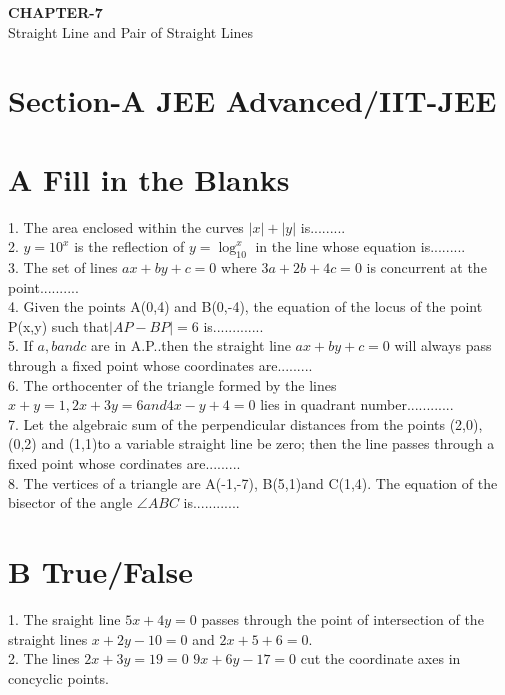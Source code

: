 \documentclass[12pt]{article}
\begin{document}
\begin{center}
\textbf{CHAPTER-7}\\
\vspace{2\bigskipamount}
\textbf\textbf\large{Straight Line and Pair of Straight Lines}


\end{center}
\section*{Section-A    JEE Advanced/IIT-JEE}
\section*{A      Fill in the Blanks}

1. The area enclosed within the curves $|x|+|y|$ is.........\\
2. $y=10^x$ is the reflection of $y=\log_10^x $ in the line whose equation is.........\\
3. The set of lines $ax+by+c=0$ where $3a+2b+4c=0$ is concurrent at the point..........\\
4. Given the points A(0,4) and B(0,-4), the equation of the locus of the point P(x,y) such that$|AP-BP|=6$ is.............\\
5. If $a,b and c$ are in A.P..then the straight line $ax+by+c=0$ will always pass through a fixed point whose coordinates are.........\\
6. The orthocenter of the triangle formed by the lines $x+y=1, 2x+3y=6  and  4x-y+4=0$ lies in quadrant number............\\
7. Let the algebraic sum of the perpendicular distances from the points (2,0), (0,2) and (1,1)to a variable straight line be zero; then the line passes through a fixed point whose cordinates are.........\\
8. The vertices of a triangle are  A(-1,-7), B(5,1)and C(1,4). The equation of the bisector of the angle $\angle{ABC}$ is............\\

\section*{B         True/False}

1. The sraight line $5x+4y=0$ passes through the point of intersection of the straight lines $x+2y-10=0$ and $2x+5+6=0$.\\
2. The lines $2x+3y=19=0$ $9x+6y-17=0$ cut the coordinate axes in concyclic points.\\
\end{document}
